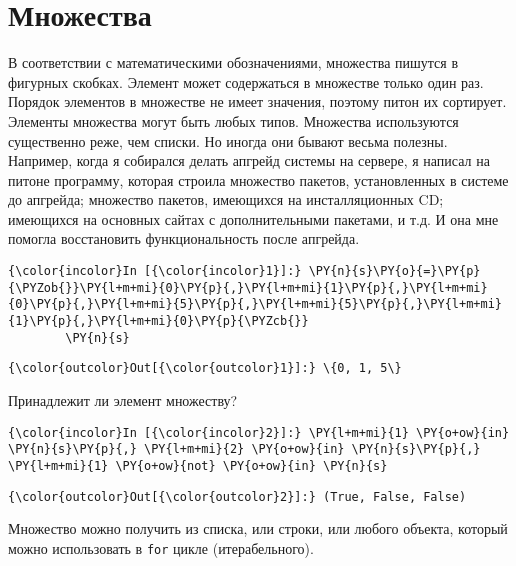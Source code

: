 \section{Множества}
\label{S105}

В соответствии с математическими обозначениями, множества пишутся в
фигурных скобках. Элемент может содержаться в множестве только один раз.
Порядок элементов в множестве не имеет значения, поэтому питон их
сортирует. Элементы множества могут быть любых типов. Множества
используются существенно реже, чем списки. Но иногда они бывают весьма
полезны. Например, когда я собирался делать апгрейд системы на сервере,
я написал на питоне программу, которая строила множество пакетов,
установленных в системе до апгрейда; множество пакетов, имеющихся на
инсталляционных CD; имеющихся на основных сайтах с дополнительными
пакетами, и т.д. И она мне помогла восстановить функциональность после
апгрейда.

    \begin{Verbatim}[commandchars=\\\{\}]
{\color{incolor}In [{\color{incolor}1}]:} \PY{n}{s}\PY{o}{=}\PY{p}{\PYZob{}}\PY{l+m+mi}{0}\PY{p}{,}\PY{l+m+mi}{1}\PY{p}{,}\PY{l+m+mi}{0}\PY{p}{,}\PY{l+m+mi}{5}\PY{p}{,}\PY{l+m+mi}{5}\PY{p}{,}\PY{l+m+mi}{1}\PY{p}{,}\PY{l+m+mi}{0}\PY{p}{\PYZcb{}}
        \PY{n}{s}
\end{Verbatim}

            \begin{Verbatim}[commandchars=\\\{\}]
{\color{outcolor}Out[{\color{outcolor}1}]:} \{0, 1, 5\}
\end{Verbatim}
        
    Принадлежит ли элемент множеству?

    \begin{Verbatim}[commandchars=\\\{\}]
{\color{incolor}In [{\color{incolor}2}]:} \PY{l+m+mi}{1} \PY{o+ow}{in} \PY{n}{s}\PY{p}{,} \PY{l+m+mi}{2} \PY{o+ow}{in} \PY{n}{s}\PY{p}{,} \PY{l+m+mi}{1} \PY{o+ow}{not} \PY{o+ow}{in} \PY{n}{s}
\end{Verbatim}

            \begin{Verbatim}[commandchars=\\\{\}]
{\color{outcolor}Out[{\color{outcolor}2}]:} (True, False, False)
\end{Verbatim}
        
    Множество можно получить из списка, или строки, или любого объекта,
который можно использовать в \texttt{for} цикле (итерабельного).

